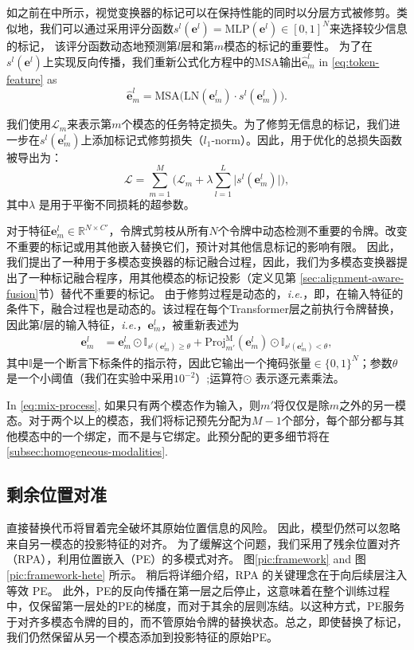 如之前在\cite{DBLP:journals/corr/abs-2106-02034}中所示，视觉变换器的标记可以在保持性能的同时以分层方式被修剪。类似地，我们可以通过采用评分函数$s^l(\bm{e}^{l})=\text{MLP}(\bm{e}^{l})\in[0,1]^N$来选择较少信息的标记， 该评分函数动态地预测第$l$层和第$m$模态的标记的重要性。
为了在$s^l(\bm{e}^{l})$上实现反向传播，我们重新公式化方程中的MSA输出$\hat{\bm{e}}_m^l$ in \ref{eq:token-feature} as 
\begin{equation}
	\label{eq:msa-output-score}
	\hat{\bm{e}}_m^l=\text{MSA}\big(\text{LN}(\bm{e}_m^{l})\cdot s^l(\bm{e}_m^{l})\big).
\end{equation}

我们使用$\mathcal{L}_m$来表示第$m$个模态的任务特定损失。为了修剪无信息的标记，我们进一步在$s^l(\bm{e}_m^{l})$上添加标记式修剪损失（$l_1$-norm）。因此，用于优化的总损失函数被导出为：
\vskip-0.1in
\begin{equation}
	\label{eq:overall-loss}
	\mathcal{L}=\sum_{m=1}^M\Big(\mathcal{L}_m+\lambda\sum_{l=1}^L\big|s^l(\bm{e}_m^{l})\big|\Big),
\end{equation}
其中$\lambda$ 是用于平衡不同损耗的超参数。

对于特征$\bm{e}_m^l\in\mathbb{R}^{N\times C'}$，令牌式剪枝从所有$N$个令牌中动态检测不重要的令牌。改变不重要的标记或用其他嵌入替换它们，预计对其他信息标记的影响有限。
因此，我们提出了一种用于多模态变换器的标记融合过程，因此，我们为多模态变换器提出了一种标记融合程序，用其他模态的标记投影（定义见第 \ref{sec:alignment-aware-fusion}节）替代不重要的标记。
由于修剪过程是动态的，{\emph{i.e.}}，即，在输入特征的条件下，融合过程也是动态的。该过程在每个Transformer层之前执行令牌替换，因此第$l$层的输入特征，\emph{i.e.}，$\bm{e}_m^l$，被重新表述为\vskip-0.2in
\begin{align}
	\label{eq:mix-process}
	\bm{e}_m^l&=\bm{e}_m^l\odot\mathbb{I}_{s^l(\bm{e}_m^{l})\ge\theta}
	+{\mathrm{Proj}}^\text{M}_{m'}(\bm{e}_m^l)\odot\mathbb{I}_{s^l(\bm{e}_m^{l})<\theta},
\end{align}
其中$\mathbb{I}$是一个断言下标条件的指示符，因此它输出一个掩码张量$\in\{0,1\}^N$；参数$\theta$是一个小阈值（我们在实验中采用$10^{-2}$）;运算符$\odot$ 表示逐元素乘法。

In \ref{eq:mix-process}, 如果只有两个模态作为输入，则$m'$将仅仅是除$m$之外的另一模态。对于两个以上的模态，我们将标记预先分配为$M-1$个部分，每个部分都与其他模态中的一个绑定，而不是与它绑定。此预分配的更多细节将在\ref{subsec:homogeneous-modalities}. 


\subsection{剩余位置对准} 
\label{subsec:rpa}
直接替换代币将冒着完全破坏其原始位置信息的风险。
因此，模型仍然可以忽略来自另一模态的投影特征的对齐。
为了缓解这个问题，我们采用了残余位置对齐（RPA），利用位置嵌入（PE）的多模式对齐。
图\ref{pic:framework} and 图\ref{pic:framework-hete} 所示。
稍后将详细介绍，RPA 的关键理念在于向后续层注入等效 PE。
此外，PE的反向传播在第一层之后停止，这意味着在整个训练过程中，仅保留第一层处的PE的梯度，而对于其余的层则冻结。以这种方式，PE服务于对齐多模态令牌的目的，而不管原始令牌的替换状态。总之，即使替换了标记，我们仍然保留从另一个模态添加到投影特征的原始PE。 



